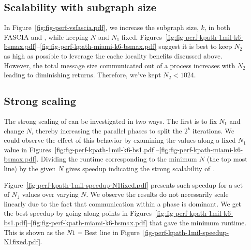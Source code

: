 


\subsection{Scalability with subgraph size}
\label{sec:perf-subgraph-size}
In Figure~\ref{fig:fig-perf-vsfascia.pdf}, we increase the subgraph size, $k$, in both FASCIA and \ouralgo{}, while keeping $N$ and $N_1$ fixed. Figures~\ref{fig:fig-perf-kpath-1mil-k6-bsmax.pdf}--\ref{fig:fig-perf-kpath-miami-k6-bsmax.pdf} suggest it is best to keep $N_2$ as high as possible to leverage the cache locality benefits discussed above. However, the total message size communicated out of a process increases with $N_2$ leading to diminishing returns. Therefore, we've kept $N_2<1024$. %

\subsection{Strong  scaling}
\label{sec:perf-strong-scaling}
The strong scaling of \ouralgo{} can be investigated in two ways. The first is to fix $N_1$ and change $N$, thereby increasing the parallel phases to split the $2^k$ iterations. We could observe the effect of this behavior by examining the values along a fixed $N_1$ value in Figures~\ref{fig:fig-perf-kpath-1mil-k6-bs1.pdf}--\ref{fig:fig-perf-kpath-miami-k6-bsmax.pdf}. Dividing the runtime corresponding to the minimum $N$ (the top most line) by the given $N$ gives speedup indicating the strong scalability of \ouralgo{}. 

Figure~\ref{fig-perf-kpath-1mil-speedup-N1fixed.pdf} presents such speedup for a set of $N_1$ values over varying $N$. We observe the results do not necessarily scale linearly due to the fact that communication within a phase is dominant. We get the best speedup by going along points in Figures~\ref{fig:fig-perf-kpath-1mil-k6-bs1.pdf}--\ref{fig:fig-perf-kpath-miami-k6-bsmax.pdf} that gave the minimum runtime. This is shown as the $N1=\text{Best}$ line in Figure~\ref{fig-perf-kpath-1mil-speedup-N1fixed.pdf}.

